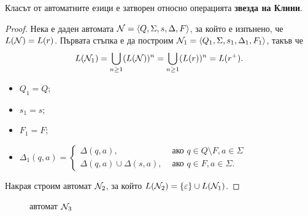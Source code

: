 \begin{lemma}
  Класът от автоматните езици е затворен относно операцията {\bf звезда на Клини}.
\end{lemma}
\begin{proof}
  Нека е даден автомата $\mathcal{N} = \langle{Q,\Sigma,s,\Delta,F}\rangle$, за който е изпънено, че
  $L(\mathcal{N}) = L(r)$.
  Първата стъпка е да построим $\mathcal{N}_1 = \langle{Q_1,\Sigma,s_1,\Delta_1,F_1}\rangle$, такъв че 
  \[L(\mathcal{N}_1) = \bigcup_{n\geq 1} (L(\mathcal{N}))^n = \bigcup_{n\geq 1} (L(r))^n = L(r^+).\]
  \begin{itemize}
  \item
    $Q_1 = Q$;
  \item
    $s_1 = s$;
  \item
    $F_1 = F$;
  \item
    $
    \Delta_1(q,a) = 
    \begin{cases}
      \Delta(q,a), & \text{ ако } q\in Q\setminus F, a \in \Sigma\\
      \Delta(q,a) \cup \Delta(s,a), & \text{ ако } q\in F, a\in\Sigma.
    \end{cases}
    $
  \end{itemize}
  Накрая строим автомат $\mathcal{N}_2$, за който $L(\mathcal{N}_2) = \{\varepsilon\} \cup L(\mathcal{N}_1)$.
\end{proof}

\begin{figure}[H]
  \label{subf:a1}
  \center  
  \caption{автомат $\mathcal{N}_3$}
\end{figure}

